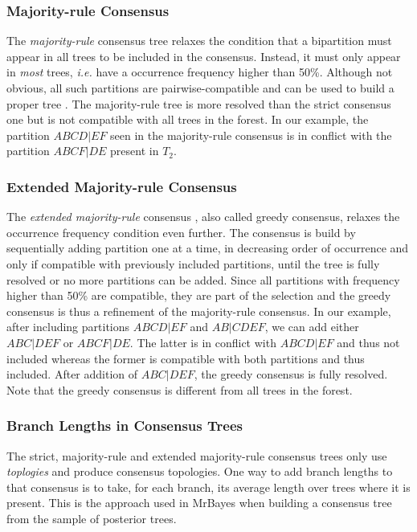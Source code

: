 \subsubsection{Majority-rule Consensus}

The \emph{majority-rule} consensus tree \citep{Margush1981} relaxes the condition that a bipartition must appear in all trees to be included in the consensus. Instead, it must only appear in \emph{most} trees, \emph{i.e.} have a occurrence frequency higher than 50\%. Although not obvious, all such partitions are pairwise-compatible and can be used to build a proper tree \citep{Buneman1971}. The majority-rule tree is more resolved than the strict consensus one but is not compatible with all trees in the forest. In our example, the partition $ABCD|EF$ seen in the majority-rule consensus is in conflict with the partition $ABCF|DE$ present in $T_2$.

\subsubsection{Extended Majority-rule Consensus}

The \emph{extended majority-rule} consensus \citep{Felsenstein2005}, also called greedy consensus, relaxes the occurrence frequency condition even further. The consensus is build by sequentially adding partition one at a time, in decreasing order of occurrence and only if compatible with previously included partitions, until the tree is fully resolved or no more partitions can be added. Since all partitions with frequency higher than 50\% are compatible, they are part of the selection and the greedy consensus is thus a refinement of the majority-rule consensus. In our example, after including partitions $ABCD|EF$ and $AB|CDEF$, we can add either $ABC|DEF$ or $ABCF|DE$. The latter is in conflict with $ABCD|EF$ and thus not included whereas the former is compatible with both partitions and thus included. After addition of $ABC|DEF$, the greedy consensus is fully resolved. Note that the greedy consensus is different from all trees in the forest.

\subsubsection{Branch Lengths in Consensus Trees}

The strict, majority-rule and extended majority-rule consensus trees only use \emph{toplogies} and produce consensus topologies. One way to add branch lengths to that consensus is to take, for each branch, its average length over trees where it is present. This is the approach used in MrBayes \citep{Ronquist2003} when building a consensus tree from the sample of posterior trees.

